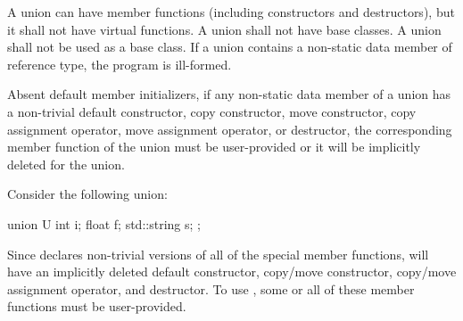 \pnum
{}%
%
%
A union can have member functions (including constructors and destructors),
%
but it shall not have virtual functions. A union shall not have
base classes. A union shall not be used as a base class.
%
If a union contains a non-static data member of
reference type, the program is ill-formed.
\begin{note}
Absent default member initializers,
if any non-static data member of a union has a non-trivial
default constructor,
copy constructor, move constructor,
copy assignment operator, move assignment operator,
or destructor, the corresponding member function
of the union must be user-provided or it will
be implicitly deleted for the union.
\begin{example}
Consider the following union:
\begin{codeblock}
union U {
  int i;
  float f;
  std::string s;
};
\end{codeblock}
Since  declares non-trivial versions of all of the special
member functions,  will have an implicitly deleted default constructor,
copy/move constructor,
copy/move assignment operator, and destructor.
To use , some or all of these member functions
must be user-provided.
\end{example}
\end{note}

